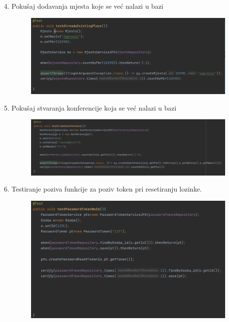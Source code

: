 \begin{enumerate}
				\setcounter{enumi}{3}
				
				\item Pokušaj dodavanja mjesta koje se već nalazi u bazi\newline
				\begin{figure}[H]
					\includegraphics[scale=0.30]{slike/deploy/backTest4.png}
					\centering
					\label{fig:promjene4}
				\end{figure}
				
				\item Pokušaj stvaranja konferencije koja se već nalazi u bazi\newline
				\begin{figure}[H]
					\includegraphics[scale=0.30]{slike/deploy/backTest5.png}
					\centering
					\label{fig:promjene5}
				\end{figure}
			
				\item Testiranje poziva funkcije za poziv token pri resetiranju lozinke.\newline
				\begin{figure}[H]
					\includegraphics[scale=0.30]{slike/deploy/backTest6.png}
					\centering
					\label{fig:promjene6}
				\end{figure}
			\end{enumerate}
